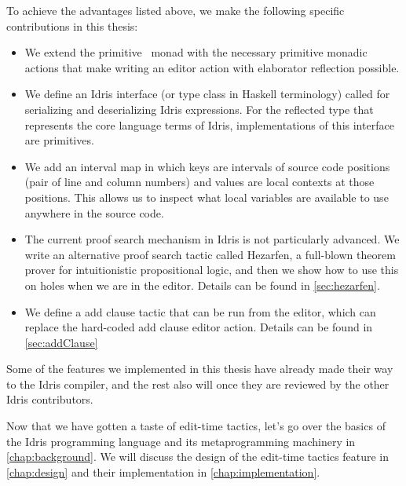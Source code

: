 To achieve the advantages listed above, we make the following specific
contributions in this thesis:
\begin{itemize}
\item We extend the primitive \Elab\ monad with the necessary primitive monadic
actions that make writing an editor action with elaborator reflection possible.
\item We define an Idris interface (or type class in Haskell terminology)
called  for serializing and deserializing Idris expressions.
For the reflected type that represents the core language terms of Idris,
implementations of this interface are primitives.
\item We add an interval map in which keys are intervals of source code
positions (pair of line and column numbers) and values are local contexts at
those positions. This allows us to inspect what local variables are available to
use anywhere in the source code.
\item The current proof search mechanism in Idris is not particularly advanced.
We write an alternative proof search tactic called Hezarfen, a full-blown
theorem prover for intuitionistic propositional logic, and then we show how
to use this on holes when we are in the editor.
Details can be found in \autoref{sec:hezarfen}.
\item We define a add clause tactic that can be run from the editor, which can
replace the hard-coded add clause editor action.
Details can be found in \autoref{sec:addClause}
\end{itemize}

Some of the features we implemented in this thesis have already made their way to
the Idris compiler, and the rest also will once they are reviewed by the
other Idris contributors.



Now that we have gotten a taste of edit-time tactics, let's go over the basics
of the Idris programming language and its metaprogramming machinery in
\autoref{chap:background}.
We will discuss the design of the edit-time tactics feature in
\autoref{chap:design} and their implementation in
\autoref{chap:implementation}.

